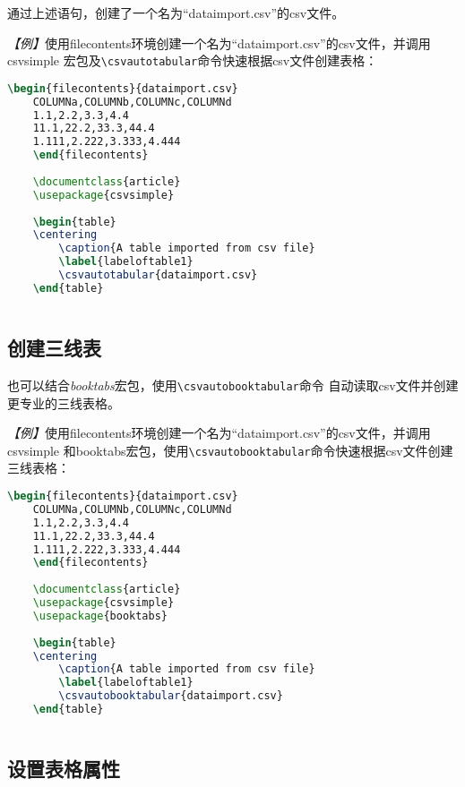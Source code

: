 通过上述语句，创建了一个名为“dataimport.csv”的csv文件。

\emph{【例】}使用filecontents环境创建一个名为“dataimport.csv”的csv文件，并调用csvsimple
宏包及\texttt{\textbackslash{}csvautotabular}命令快速根据csv文件创建表格：
\begin{lstlisting}[language=TeX]
    \begin{filecontents}{dataimport.csv}
    COLUMNa,COLUMNb,COLUMNc,COLUMNd
    1.1,2.2,3.3,4.4
    11.1,22.2,33.3,44.4
    1.111,2.222,3.333,4.444
    \end{filecontents}
    
    \documentclass{article}
    \usepackage{csvsimple}
    
    \begin{table}
    \centering
        \caption{A table imported from csv file}
        \label{labeloftable1}
        \csvautotabular{dataimport.csv}
    \end{table}
    
\end{lstlisting}

\subsection{创建三线表}

也可以结合\emph{booktabs}宏包，使用\texttt{\textbackslash{}csvautobooktabular}命令
自动读取csv文件并创建更专业的三线表格。

\emph{【例】}使用filecontents环境创建一个名为“dataimport.csv”的csv文件，并调用csvsimple
和booktabs宏包，使用\texttt{\textbackslash{}csvautobooktabular}命令快速根据csv文件创建三线表格：
\begin{lstlisting}[language=TeX]
    \begin{filecontents}{dataimport.csv}
    COLUMNa,COLUMNb,COLUMNc,COLUMNd
    1.1,2.2,3.3,4.4
    11.1,22.2,33.3,44.4
    1.111,2.222,3.333,4.444
    \end{filecontents}
    
    \documentclass{article}
    \usepackage{csvsimple}
    \usepackage{booktabs}
    
    \begin{table}
    \centering
        \caption{A table imported from csv file}
        \label{labeloftable1}
        \csvautobooktabular{dataimport.csv}
    \end{table}
    
\end{lstlisting}

\subsection{设置表格属性}

